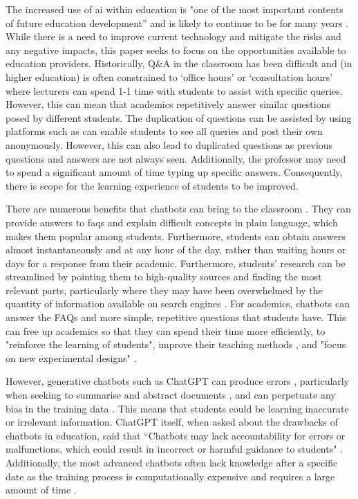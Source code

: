 The increased use of \acrshort{ai} within education is "one of the most important contents of future education development” \citep{BrowMcCoReev2020eu} and is likely to continue to be for many years \citep{zawacki2019systematic}. While there is a need to improve current technology and mitigate the risks and any negative impacts, this paper seeks to focus on the opportunities available to education providers. Historically, Q\&A in the classroom has been difficult and (in higher education) is often constrained to `office hours' or `consultation hours' where lecturers can spend 1-1 time with students to assist with specific queries. However, this can mean that academics repetitively answer similar questions posed by different students. The duplication of questions can be assisted by using platforms such as \citet{Piazza} can enable students to see all queries and post their own anonymously. However, this can also lead to duplicated questions as previous questions and answers are not always seen. Additionally, the professor may need to spend a significant amount of time typing up specific answers. Consequently, there is scope for the learning experience of students to be improved.

There are numerous benefits that chatbots can bring to the classroom \citep{Stanislav}. They can provide answers to \acrshort{faq}s and explain difficult concepts in plain language, which makes them popular among students. Furthermore, students can obtain answers almost instantaneously and at any hour of the day, rather than waiting hours or days for a response from their academic. Furthermore, students' research can be streamlined by pointing them to high-quality sources and finding the most relevant parts, particularly where they may have been overwhelmed by the quantity of information available on search engines \citep{Chen22}. For academics, chatbots can answer the FAQs and more simple, repetitive questions that students have. This can free up academics so that they can spend their time more efficiently, to "reinforce the learning of students", improve their teaching methods \citep{Prez2020}, and "focus on new experimental designs" \citep{Eva}.

However, generative chatbots such as ChatGPT can produce errors \citep{marcus2018, Bender21, Eva}, particularly when seeking to summarise and abstract documents \citep{Durmus_2020}, and can perpetuate any bias in the training data \citep{geva2019, brown2020}. This means that students could be learning inaccurate or irrelevant information. ChatGPT itself, when asked about the drawbacks of chatbots in education, said that ``Chatbots may lack accountability for errors or malfunctions, which could result in incorrect or harmful guidance to students" \citep{chatgpt23}. Additionally, the most advanced chatbots often lack knowledge after a specific date as the training process is computationally expensive and requires a large amount of time \citep{Jungherr}.

